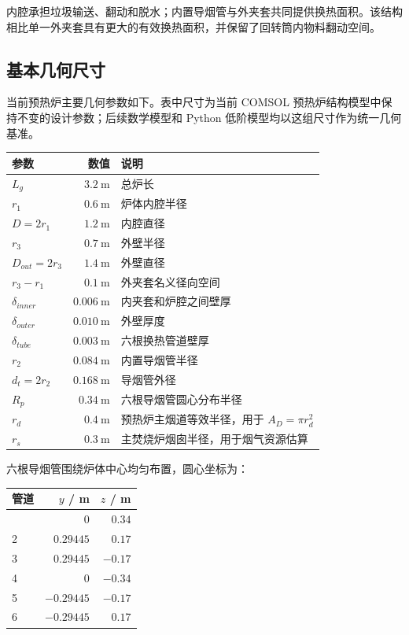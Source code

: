\documentclass[UTF8,openany,zihao=-4,oneside]{ctexbook}
\begin{document}
内腔承担垃圾输送、翻动和脱水；内置导烟管与外夹套共同提供换热面积。该结构相比单一外夹套具有更大的有效换热面积，并保留了回转筒内物料翻动空间。

\subsection{基本几何尺寸}\label{ux57faux672cux51e0ux4f55ux5c3aux5bf8}

当前预热炉主要几何参数如下。表中尺寸为当前 COMSOL 预热炉结构模型中保持不变的设计参数；后续数学模型和 Python 低阶模型均以这组尺寸作为统一几何基准。

\begin{longtable}[c]{@{}lrl@{}}
\toprule\noalign{}
参数 & 数值 & 说明 \\
\midrule\noalign{}
\endhead
\bottomrule\noalign{}
\endlastfoot
\(L_g\) & \(3.2\ \mathrm{m}\) & 总炉长 \\
\(r_1\) & \(0.6\ \mathrm{m}\) & 炉体内腔半径 \\
\(D=2r_1\) & \(1.2\ \mathrm{m}\) & 内腔直径 \\
\(r_3\) & \(0.7\ \mathrm{m}\) & 外壁半径 \\
\(D_{out}=2r_3\) & \(1.4\ \mathrm{m}\) & 外壁直径 \\
\(r_3-r_1\) & \(0.1\ \mathrm{m}\) & 外夹套名义径向空间 \\
\(\delta_{inner}\) & \(0.006\ \mathrm{m}\) & 内夹套和炉腔之间壁厚 \\
\(\delta_{outer}\) & \(0.010\ \mathrm{m}\) & 外壁厚度 \\
\(\delta_{tube}\) & \(0.003\ \mathrm{m}\) & 六根换热管道壁厚 \\
\(r_2\) & \(0.084\ \mathrm{m}\) & 内置导烟管半径 \\
\(d_t=2r_2\) & \(0.168\ \mathrm{m}\) & 导烟管外径 \\
\(R_p\) & \(0.34\ \mathrm{m}\) & 六根导烟管圆心分布半径 \\
\(r_d\) & \(0.4\ \mathrm{m}\) & 预热炉主烟道等效半径，用于 \(A_D=\pi r_d^2\) \\
\(r_s\) & \(0.3\ \mathrm{m}\) & 主焚烧炉烟囱半径，用于烟气资源估算 \\
\end{longtable}

六根导烟管围绕炉体中心均匀布置，圆心坐标为：

\begin{longtable}[c]{@{}lrr@{}}
\toprule\noalign{}
管道 & \(y\) / m & \(z\) / m \\
\midrule\noalign{}
\endhead
\bottomrule\noalign{}
\endlastfoot
1 & \(0\) & \(0.34\) \\
2 & \(0.29445\) & \(0.17\) \\
3 & \(0.29445\) & \(-0.17\) \\
4 & \(0\) & \(-0.34\) \\
5 & \(-0.29445\) & \(-0.17\) \\
6 & \(-0.29445\) & \(0.17\) \\
\end{longtable}
\end{document}

